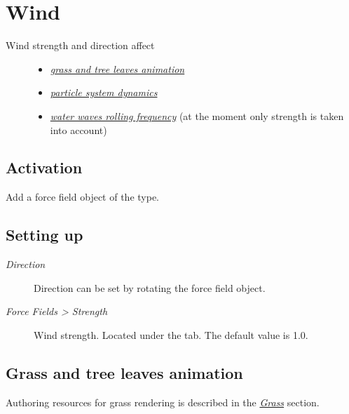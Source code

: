 \documentclass[a4paper,12pt,oneside]{sphinxmanual}
\begin{document}
\section{Wind}
\label{outdoor_rendering:id30}\label{outdoor_rendering:wind}\begin{description}
\item[{Wind strength and direction affect}] \leavevmode\begin{itemize}
\item {} 
{\hyperref[outdoor_rendering:wind-bending]{\emph{grass and tree leaves animation}}}

\item {} 
{\hyperref[particles:particles-force-fields]{\emph{particle system dynamics}}}

\item {} 
{\hyperref[outdoor_rendering:water-volumetric-waves]{\emph{water waves rolling frequency}}} (at the moment only strength is taken into account)

\end{itemize}

\end{description}


\subsection{Activation}
\label{outdoor_rendering:id31}
Add a force field object of the  type.


\subsection{Setting up}
\label{outdoor_rendering:id32}\begin{description}
\item[{\emph{Direction}}] \leavevmode
Direction can be set by rotating the force field object.

\item[{\emph{Force Fields \textgreater{} Strength}}] \leavevmode
Wind strength. Located under the  tab. The default value is 1.0.

\end{description}


\subsection{Grass and tree leaves animation}
\label{outdoor_rendering:wind-bending}\label{outdoor_rendering:id33}
Authoring resources for grass rendering is described in the {\hyperref[particles_instancing:particles-grass]{\emph{Grass}}} section.
\end{document}
